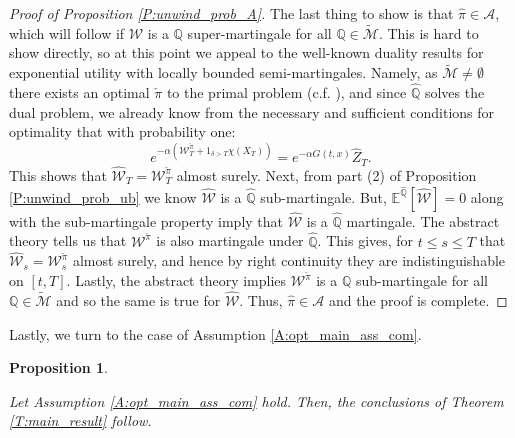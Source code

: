 \documentclass[11pt, letterpaper]{amsart}
\newtheorem{proposition}[theorem]{Proposition}
\theoremstyle{definition}
\theoremstyle{remark}
\numberwithin{equation}{section}
\newcommand{\We}{\mathcal{W}}
\newcommand{\hwe}{\hat{\We}}
\newcommand{\hz}{\hat{Z}}
\newcommand{\hqprob}{\hat{\qprob}}
\newcommand{\hpi}{\hat{\pi}}
\newcommand{\qprob}{\mathbb{Q}}
\newcommand{\esp}{\mathbb{E}}
\newcommand{\espalt}[2]{\esp^{#1}\bra{#2}}
\newcommand{\tM}{\widetilde{\mathcal{M}}}
\newcommand{\bra}[1]{\left[#1\right]}
\begin{document}
\begin{proof}[Proof of Proposition \ref{P:unwind_prob_A}]
The last thing to show is that $\hpi\in\mathcal{A}$, which will follow if $\hwe$ is a $\qprob$ super-martingale for all $\qprob\in\tM$.  This is hard to show directly, so at this point we appeal to the well-known duality results for exponential utility with locally bounded semi-martingales.  Namely, as $\tM\neq \emptyset$ there exists an optimal $\check{\pi}$ to the primal problem (c.f. \cite{MR2489605}), and since $\hqprob$ solves the dual problem, we already know from the necessary and sufficient conditions for optimality that with probability one:
\begin{equation*}
e^{-\alpha\left(\We^{\check{\pi}}_T + 1_{\delta > T}\chi(X_T)\right)} = e^{-\alpha G(t,x)}\hz_T.
\end{equation*}
This shows that $\hwe_T = \We^{\check{\pi}}_T$ almost surely.  Next, from part (2) of Proposition \ref{P:unwind_prob_ub} we know $\hwe$ is a $\hqprob$ sub-martingale.  But, $\espalt{\hqprob}{\hwe} = 0$ along with the sub-martingale property imply that $\hwe$ is a $\hqprob$ martingale. The abstract theory tells us that $\We^{\check{\pi}}$ is also martingale under $\hqprob$.  This gives, for $t\leq s\leq T$ that $\hwe_s = \We^{\check{\pi}}_s$ almost surely, and hence by right continuity they are indistinguishable on $[t,T]$.  Lastly, the abstract theory implies $\We^{\check{\pi}}$ is a $\qprob$ sub-martingale for all $\qprob\in\tM$ and so the same is true for $\hwe$.  Thus, $\hpi\in \mathcal{A}$ and the proof is complete.


\end{proof}

Lastly, we turn to the case of Assumption \ref{A:opt_main_ass_com}.

\begin{proposition}\label{P:unwind_prob_B}

Let Assumption \ref{A:opt_main_ass_com} hold.  Then, the conclusions of Theorem \ref{T:main_result} follow.

\end{proposition}
\end{document}
